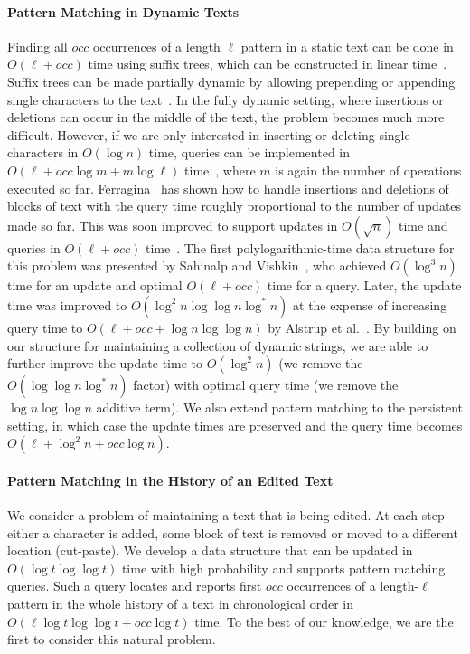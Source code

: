 \documentclass[a4paper]{article}
\theoremstyle{remark}
\begin{document}
\paragraph{Pattern Matching in Dynamic Texts}
Finding all $occ$ occurrences of a length $\ell$ pattern in a static text can be done in $O(\ell+occ)$ time
using suffix trees, which can be constructed in linear time~\cite{McCreight:1976,SuffixTree}.
Suffix trees can be made partially dynamic by allowing prepending or appending single characters
to the text~\cite{onlinesuffix}. In the fully dynamic setting, where insertions or deletions can
occur in the middle of the text, the problem becomes much more difficult.
However, if we are only interested in inserting or deleting single characters in $O(\log n)$ time,
queries can be implemented in $O(\ell+ occ \log m + m \log \ell)$ time~\cite{Gu:1994},
where $m$ is again the number of operations executed so far.
Ferragina~\cite{Ferragina:1997} has shown how to handle insertions and deletions of blocks of text with the query
time roughly proportional to the number of updates made so far. This was soon improved to support
updates in $O(\sqrt{n})$ time and queries in $O(\ell+occ)$ time~\cite{DBLP:journals/siamcomp/FerraginaG98}.
The first polylogarithmic-time data structure for this problem was presented by Sahinalp and Vishkin~\cite{Sahinalp:1996}, who achieved $O(\log^3 n)$ time for an update and optimal
$O(\ell+occ)$ time for a query. Later, the update time was improved to
$O(\log^2n \log \log n \log^* n)$ at the expense of increasing query time to
$O(\ell+ occ + \log n \log \log n)$ by Alstrup et al.~\cite{Alstrup}. By building on our structure
for maintaining a collection of dynamic strings, we are able to further improve the update time
to $O(\log^2n)$ (we remove the $O(\log \log n \log^{*} n)$ factor) with optimal query time (we remove the $\log n \log \log n$ additive term).
We also extend pattern matching to the persistent setting, in which case the update times are preserved
and the query time becomes $O(\ell+\log^2 n + occ\log n)$.

\paragraph{Pattern Matching in the History of an Edited Text}
We consider a problem of maintaining a text that is being edited.
At each step either a character is added, some block of text is removed or moved to a different location (cut-paste).
We develop a data structure that can be updated in $O(\log t \log \log t)$ time with high probability and
supports pattern matching queries.
Such a query locates and reports first $occ$ occurrences of a length-$\ell$ pattern in the whole history of a text in chronological
order in $O(\ell \log t \log \log t + occ\log t)$ time.
To the best of our knowledge, we are the first to consider this natural problem.
\end{document}
